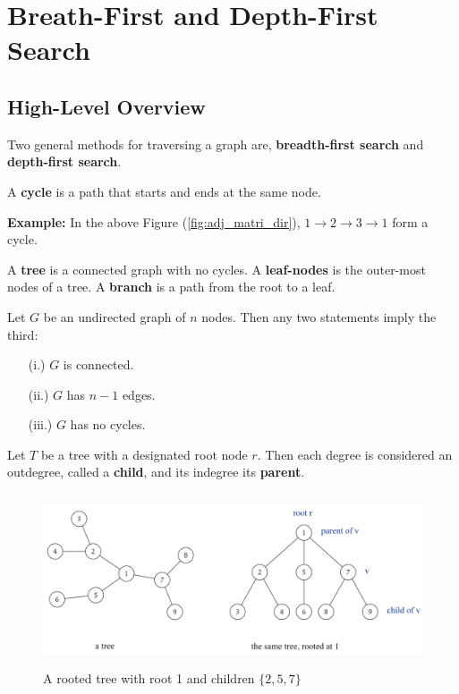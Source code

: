 \section{Breath-First and Depth-First Search}
\subsection{High-Level Overview}
Two general methods for traversing a graph are, \textbf{breadth-first search} and \textbf{depth-first search}.

\label{sec:bfs_dfs}
\begin{Def}[Cycle]

    A \textbf{cycle} is a path that starts and ends at the same node.
\end{Def}
\textbf{Example:} In the above Figure (\ref{fig:adj_matri_dir}), $1\rightarrow 2 \rightarrow 3 \rightarrow 1$ form a cycle.
\begin{Def}[Tree]

    A \textbf{tree} is a connected graph with no cycles. A \textbf{leaf-nodes} is the outer-most nodes of a tree. A \textbf{branch} is a path from the root to a leaf.  
\end{Def}
\newpage
\begin{theo}

    Let $G$ be an undirected graph of $n$ nodes. Then any two statements imply the third:
    \begin{enumerate}
        \item [(i.)] $G$ is connected.
        \item [(ii.)] $G$ has $n-1$ edges.
        \item [(iii.)] $G$ has no cycles.
    \end{enumerate}
\end{theo}

\begin{Def}
    
        Let $T$ be a tree with a designated root node $r$. Then each degree is 
        considered an outdegree, called a \textbf{child}, and its indegree its \textbf{parent}.
\end{Def}
\begin{figure}[h]
    \begin{center}
      \includegraphics[height=2in]{./Sections/graphs/rooted_tree.png}
    \end{center}
     \caption{A rooted tree with root 1 and children $\{2,5,7\}$}\label{fig:rooted_tree}
  \end{figure}

